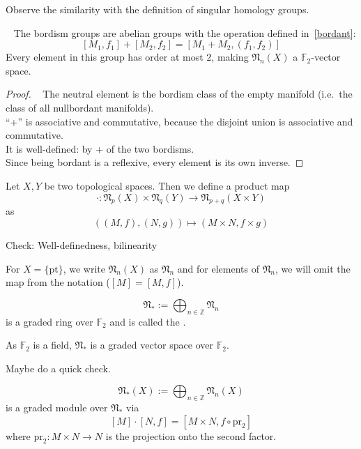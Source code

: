 \documentclass[a4paper,11pt]{article}
\begin{document}
Observe the similarity with the definition of singular homology groups.

\begin{theorem}\ \cite[II, Satz 2.1]{brocker}
    The bordism groups are abelian groups with the operation defined in\ \ref{bordant}:
    \[[M_1,f_1]+[M_2,f_2]=[M_1+M_2,(f_1,f_2)]\]
    Every element in this group has order at most \(2\), making \(\mathfrak{N}_n(X)\) a \(\mathbb{F}_2\)-vector space.
\end{theorem}

\begin{proof}
    \ \cite{brocker}
    The neutral element is the bordism class of the empty manifold (i.e.\ the class of all nullbordant manifolds).\\
    \enquote{+} is associative and commutative, because the disjoint union is associative and commutative.\\
    It is well-defined: by + of the two bordisms.\\
    Since being bordant is a reflexive, every element is its own inverse.
\end{proof}

Let \(X,Y\) be two topological spaces. Then we define a product map
\[\cdot:\mathfrak{N}_p(X)\times\mathfrak{N}_q(Y)\to\mathfrak{N}_{p+q}(X\times Y)\]
as
\[((M,f),(N,g))\mapsto (M\times N,f\times g)\]

\begin{remark}
    Check: Well-definedness, bilinearity
\end{remark}

For \(X=\{\mathrm{pt}\}\), we write \(\mathfrak{N}_n(X)\) as \(\mathfrak{N}_n\) and for elements of \(\mathfrak{N}_n\), we will omit the map from the notation (\([M]=[M,f]\)).

\begin{definition}
    \[\mathfrak{N}_\ast:=\bigoplus_{n\in\mathbb{Z}}\mathfrak{N}_n\]
    is a graded ring over \(\mathbb{F}_2\) and is called the .
\end{definition}

\begin{remark}
    As \(\mathbb{F}_2\) is a field, \(\mathfrak{N}_\ast\) is a graded vector space over \(\mathbb{F}_2\).
\end{remark}

Maybe do a quick check.

\begin{definition}
    \[\mathfrak{N}_\ast(X):=\bigoplus_{n\in\mathbb{Z}}\mathfrak{N}_n(X)\]
    is a graded module over \(\mathfrak{N}_\ast\) via
    \[[M]\cdot[N,f]=[M\times N, f\circ \mathrm{pr}_2]\]
    where \(\mathrm{pr}_2:M\times N\to N\) is the projection onto the second factor.
\end{definition}
\end{document}
